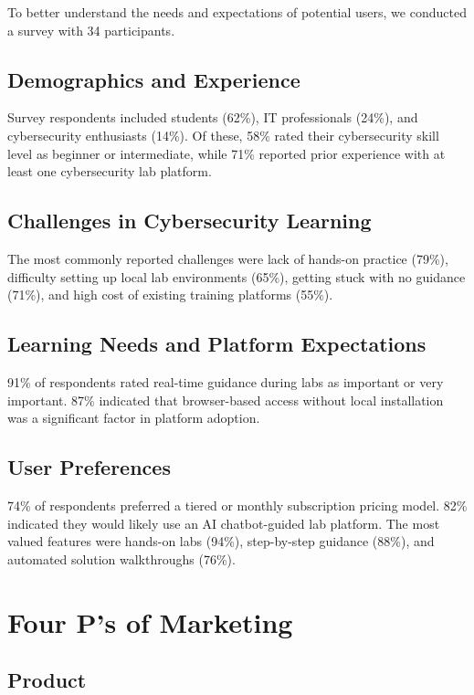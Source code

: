 \documentclass[12pt,a4paper]{report}
\begin{document}
To better understand the needs and expectations of potential users, we conducted a survey with 34
participants.

\subsection{Demographics and Experience}

Survey respondents included students (62\%), IT professionals (24\%), and cybersecurity enthusiasts
(14\%). Of these, 58\% rated their cybersecurity skill level as beginner or intermediate, while 71\%
reported prior experience with at least one cybersecurity lab platform.

\subsection{Challenges in Cybersecurity Learning}

The most commonly reported challenges were lack of hands-on practice (79\%), difficulty setting up
local lab environments (65\%), getting stuck with no guidance (71\%), and high cost of existing
training platforms (55\%).

\subsection{Learning Needs and Platform Expectations}

91\% of respondents rated real-time guidance during labs as important or very important. 87\% indicated
that browser-based access without local installation was a significant factor in platform adoption.

\subsection{User Preferences}

74\% of respondents preferred a tiered or monthly subscription pricing model. 82\% indicated they
would likely use an AI chatbot-guided lab platform. The most valued features were hands-on labs (94\%),
step-by-step guidance (88\%), and automated solution walkthroughs (76\%).

\section{Four P's of Marketing}

\subsection{Product}
\end{document}
